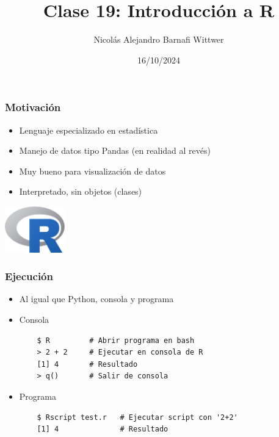 \documentclass[14pt,aspectratio=169,xcolor=dvipsnames]{beamer}
\title[short title]{Clase 19: Introducción a R}
\subtitle{}
\author[NA Barnafi] {Nicolás Alejandro Barnafi Wittwer}
\institute[UC|CMM] 
{
    Pontificia Universidad Católica de Chile \\
    Centro de Modelamiento Matemático
}
\date{16/10/2024}
\begin{document}
\begin{frame}
    \maketitle
\end{frame}
\begin{frame}\frametitle{Motivación}
    \begin{itemize}
        \item Lenguaje especializado en estadística
        \item Manejo de datos tipo Pandas (en realidad al revés)
        \item Muy bueno para visualización de datos
        \item Interpretado, sin objetos (clases)
    \end{itemize}
    \begin{flushright}
        \includegraphics[height=2cm]{../images/logos/R.png}
    \end{flushright}
\end{frame}
\begin{frame}[fragile]\frametitle{Ejecución}
    \begin{itemize}
        \item Al igual que Python, consola y programa
        \item Consola
            \begin{verbatim}
    $ R         # Abrir programa en bash
    > 2 + 2     # Ejecutar en consola de R
    [1] 4       # Resultado 
    > q()       # Salir de consola
            \end{verbatim}
        \item Programa
            \begin{verbatim}
    $ Rscript test.r   # Ejecutar script con '2+2'
    [1] 4              # Resultado 
            \end{verbatim}

    \end{itemize}
\end{frame}
\end{document}
